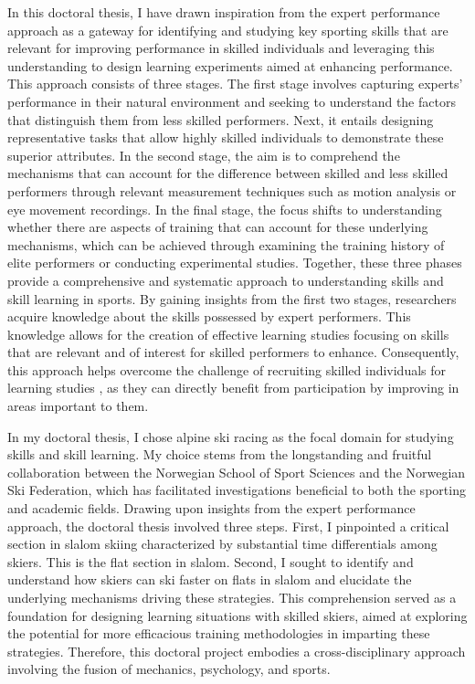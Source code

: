 In this doctoral thesis, I have drawn inspiration from the expert performance approach \cite{ericsson_development_2003, ericsson_prospects_2002, williams_using_2017, williams_perceptual-cognitive_2005} as a gateway for identifying and studying key sporting skills that are relevant for improving performance in skilled individuals and leveraging this understanding to design learning experiments aimed at enhancing performance. This approach consists of three stages. The first stage involves capturing experts' performance in their natural environment and seeking to understand the factors that distinguish them from less skilled performers. Next, it entails designing representative tasks that allow highly skilled individuals to demonstrate these superior attributes. In the second stage, the aim is to comprehend the mechanisms that can account for the difference between skilled and less skilled performers through relevant measurement techniques such as motion analysis or eye movement recordings. In the final stage, the focus shifts to understanding whether there are aspects of training that can account for these underlying mechanisms, which can be achieved through examining the training history of elite performers or conducting experimental studies. Together, these three phases provide a comprehensive and systematic approach to understanding skills and skill learning in sports. By gaining insights from the first two stages, researchers acquire knowledge about the skills possessed by expert performers. This knowledge allows for the creation of effective learning studies focusing on skills that are relevant and of interest for skilled performers to enhance. Consequently, this approach helps overcome the challenge of recruiting skilled individuals for learning studies \cite{farrow_chapter_2017, buszard_quantifying_2017}, as they can directly benefit from participation by improving in areas important to them.

In my doctoral thesis, I chose alpine ski racing as the focal domain for studying skills and skill learning. My choice stems from the longstanding and fruitful collaboration between the Norwegian School of Sport Sciences and the Norwegian Ski Federation, which has facilitated investigations beneficial to both the sporting and academic fields. Drawing upon insights from the expert performance approach, the doctoral thesis involved three steps. First, I  pinpointed a critical section in slalom skiing characterized by substantial time differentials among skiers. This is the flat section in slalom. Second, I sought to identify and understand how skiers can ski faster on flats in slalom and elucidate the underlying mechanisms driving these strategies. This comprehension served as a foundation for designing learning situations with skilled skiers, aimed at exploring the potential for more efficacious training methodologies in imparting these strategies. Therefore, this doctoral project embodies a cross-disciplinary approach involving the fusion of mechanics, psychology, and sports. 
 

